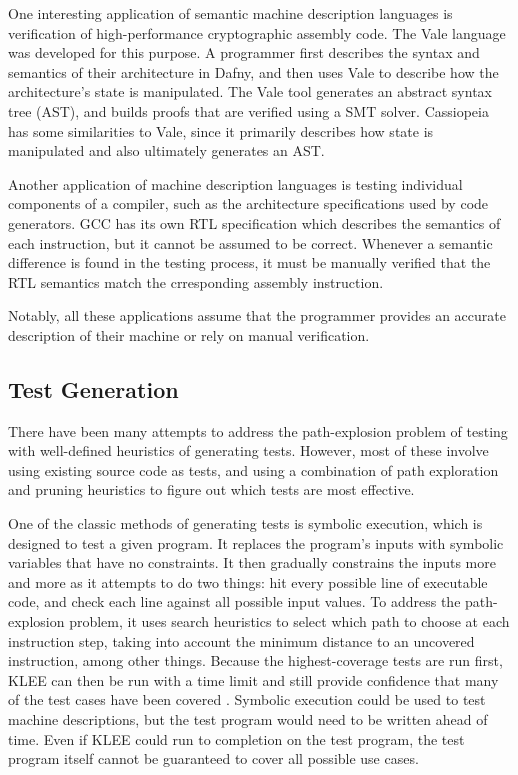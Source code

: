 \documentclass[letterpaper,12pt]{article}
\begin{document}
One interesting application of semantic machine description languages is verification of high-performance cryptographic assembly code. The Vale language was developed for this purpose. A programmer first describes the syntax and semantics of their architecture in Dafny, and then uses Vale to describe how the architecture's state is manipulated. The Vale tool generates an abstract syntax tree (AST), and builds proofs that are verified using a SMT solver\cite{Vale}. Cassiopeia has some similarities to Vale, since it primarily describes how state is manipulated and also ultimately generates an AST.

Another application of machine description languages is testing individual components of a compiler, such as the architecture specifications used by code generators. GCC has its own RTL specification which describes the semantics of each instruction, but it cannot be assumed to be correct. Whenever a semantic difference is found in the testing process, it must be manually verified that the RTL semantics match the crresponding assembly instruction\cite{Cgo}.

Notably, all these applications assume that the programmer provides an accurate description of their machine or rely on manual verification.

\subsection{Test Generation}

There have been many attempts to address the path-explosion problem of testing with well-defined heuristics of generating tests. However, most of these involve using existing source code as tests, and using a combination of path exploration and pruning heuristics to figure out which tests are most effective.

One of the classic methods of generating tests is symbolic execution, which is designed to test a given program. It replaces the program's inputs with symbolic variables that have no constraints. It then gradually constrains the inputs more and more as it attempts to do two things: hit every possible line of executable code, and check each line against all possible input values. To address the path-explosion problem, it uses search heuristics to select which path to choose at each instruction step, taking into account the minimum distance to an uncovered instruction, among other things. Because the highest-coverage tests are run first, KLEE can then be run with a time limit and still provide confidence that many of the test cases have been covered \cite{Klee}. Symbolic execution could be used to test machine descriptions, but the test program would need to be written ahead of time. Even if KLEE could run to completion on the test program, the test program itself cannot be guaranteed to cover all possible use cases.
\end{document}
